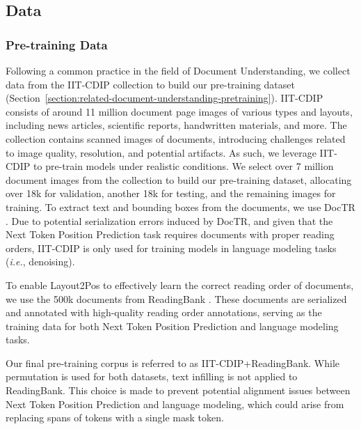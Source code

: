 
\subsection{Data}

\subsubsection{Pre-training Data}

Following a common practice in the field of Document Understanding, we collect data from the IIT-CDIP collection \citep{lewis2006building} to build our pre-training dataset (Section~\ref{section:related-document-understanding-pretraining}). IIT-CDIP consists of around 11 million document page images of various types and layouts, including news articles, scientific reports, handwritten materials, and more. The collection contains scanned images of documents, introducing challenges related to image quality, resolution, and potential artifacts. As such, we leverage IIT-CDIP to pre-train models under realistic conditions. We select over 7 million document images from the collection to build our pre-training dataset, allocating over 18k for validation, another 18k for testing, and the remaining images for training. To extract text and bounding boxes from the documents, we use DocTR \citep{doctr2021}. Due to potential serialization errors induced by DocTR, and given that the Next Token Position Prediction task requires documents with proper reading orders, IIT-CDIP is only used for training models in language modeling tasks (\textit{i.e.}, denoising). 

To enable Layout2Pos to effectively learn the correct reading order of documents, we use the 500k documents from ReadingBank \citep{wang2021layoutreader}. These documents are serialized and annotated with high-quality reading order annotations, serving as the training data for both Next Token Position Prediction and language modeling tasks. 

Our final pre-training corpus is referred to as IIT-CDIP+ReadingBank. While permutation is used for both datasets, text infilling is not applied to ReadingBank. This choice is made to prevent potential alignment issues between Next Token Position Prediction and language modeling, which could arise from replacing spans of tokens with a single mask token.

